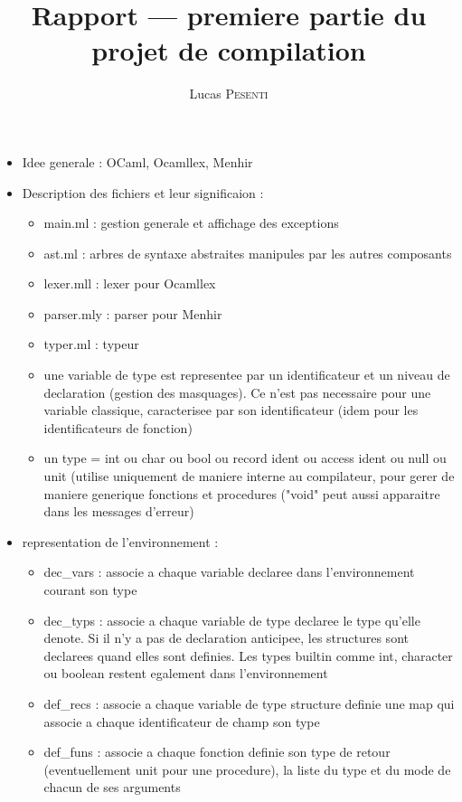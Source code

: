 \documentclass[a4paper,12pt]{article}
\title{Rapport --- premiere partie du projet de compilation}
\author{Lucas \textsc{Pesenti}}
\begin{document}
\date{}

\maketitle
\begin{itemize}
\item Idee generale : OCaml, Ocamllex, Menhir
\item Description des fichiers et leur significaion :
\begin{itemize}
\item main.ml : gestion generale et affichage des exceptions
\item ast.ml : arbres de syntaxe abstraites manipules par les autres composants
\item lexer.mll : lexer pour Ocamllex
\item parser.mly : parser pour Menhir
\item typer.ml : typeur
\end{itemize}
\begin{itemize}
\item une variable de type est representee par un identificateur et un niveau de declaration (gestion des masquages). Ce n'est pas necessaire pour une variable classique, caracterisee par son identificateur (idem pour les identificateurs de fonction)
\item un type = int ou char ou bool ou record ident ou access ident ou null ou unit (utilise uniquement de maniere interne au compilateur, pour gerer de maniere generique fonctions et procedures ("void" peut aussi apparaitre dans les messages d'erreur)
\end{itemize}
\item representation de l'environnement :
\begin{itemize}
\item dec\_vars : associe a chaque variable declaree dans l'environnement courant son type
\item dec\_typs : associe a chaque variable de type declaree le type qu'elle denote. Si il n'y a pas de declaration anticipee, les structures sont declarees quand elles sont definies. Les types builtin comme int, character ou boolean restent egalement dans l'environnement
\item def\_recs : associe a chaque variable de type structure definie une map qui associe a chaque identificateur de champ son type
\item def\_funs : associe a chaque fonction definie son type de retour (eventuellement unit pour une procedure), la liste du type et du mode de chacun de ses arguments

\end{itemize}
\end{itemize}
\end{document}
